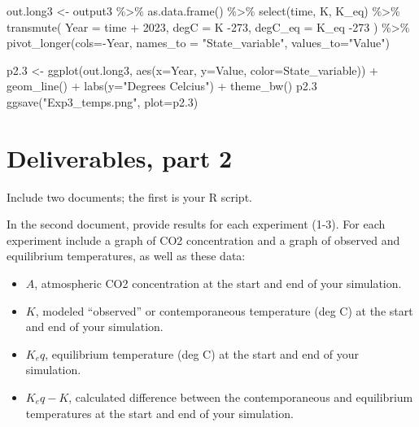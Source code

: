 \documentclass[
  letterpaper,
  DIV=11,
  numbers=noendperiod]{scrreprt}
\newenvironment{Shaded}{\begin{snugshade}}{\end{snugshade}}
\newcommand{\AttributeTok}[1]{\textcolor[rgb]{0.40,0.45,0.13}{#1}}
\newcommand{\DecValTok}[1]{\textcolor[rgb]{0.68,0.00,0.00}{#1}}
\newcommand{\FloatTok}[1]{\textcolor[rgb]{0.68,0.00,0.00}{#1}}
\newcommand{\FunctionTok}[1]{\textcolor[rgb]{0.28,0.35,0.67}{#1}}
\newcommand{\NormalTok}[1]{\textcolor[rgb]{0.00,0.23,0.31}{#1}}
\newcommand{\OtherTok}[1]{\textcolor[rgb]{0.00,0.23,0.31}{#1}}
\newcommand{\SpecialCharTok}[1]{\textcolor[rgb]{0.37,0.37,0.37}{#1}}
\newcommand{\StringTok}[1]{\textcolor[rgb]{0.13,0.47,0.30}{#1}}
\providecommand{\tightlist}{%
  \setlength{\itemsep}{0pt}\setlength{\parskip}{0pt}}
\begin{document}
\begin{Shaded}
\begin{Highlighting}[]
\NormalTok{out.long3 }\OtherTok{\textless{}{-}}\NormalTok{ output3 }\SpecialCharTok{\%\textgreater{}\%} \FunctionTok{as.data.frame}\NormalTok{() }\SpecialCharTok{\%\textgreater{}\%}
  \FunctionTok{select}\NormalTok{(time, K, K\_eq) }\SpecialCharTok{\%\textgreater{}\%}
  \FunctionTok{transmute}\NormalTok{(}
    \AttributeTok{Year =}\NormalTok{ time }\SpecialCharTok{+} \DecValTok{2023}\NormalTok{,}
    \AttributeTok{degC =}\NormalTok{ K }\SpecialCharTok{{-}}\DecValTok{273}\NormalTok{,}
    \AttributeTok{degC\_eq =}\NormalTok{ K\_eq }\SpecialCharTok{{-}}\DecValTok{273}
\NormalTok{  ) }\SpecialCharTok{\%\textgreater{}\%}
  \FunctionTok{pivot\_longer}\NormalTok{(}\AttributeTok{cols=}\SpecialCharTok{{-}}\NormalTok{Year, }\AttributeTok{names\_to =} \StringTok{"State\_variable"}\NormalTok{, }
               \AttributeTok{values\_to=}\StringTok{"Value"}\NormalTok{)}

\NormalTok{p2}\FloatTok{.3} \OtherTok{\textless{}{-}} \FunctionTok{ggplot}\NormalTok{(out.long3, }\FunctionTok{aes}\NormalTok{(}\AttributeTok{x=}\NormalTok{Year, }\AttributeTok{y=}\NormalTok{Value, }\AttributeTok{color=}\NormalTok{State\_variable)) }\SpecialCharTok{+} 
  \FunctionTok{geom\_line}\NormalTok{() }\SpecialCharTok{+} 
  \FunctionTok{labs}\NormalTok{(}\AttributeTok{y=}\StringTok{"Degrees Celcius"}\NormalTok{)  }\SpecialCharTok{+}
  \FunctionTok{theme\_bw}\NormalTok{()}
\NormalTok{p2}\FloatTok{.3}
\FunctionTok{ggsave}\NormalTok{(}\StringTok{"Exp3\_temps.png"}\NormalTok{, }\AttributeTok{plot=}\NormalTok{p2}\FloatTok{.3}\NormalTok{)}
\end{Highlighting}
\end{Shaded}

\section{Deliverables, part 2}\label{sec-deliverables-ei2}

Include two documents; the first is your R script.

In the second document, provide results for each experiment (1-3). For
each experiment include a graph of CO2 concentration and a graph of
observed and equilibrium temperatures, as well as these data:

\begin{itemize}
\tightlist
\item
  \(A\), atmospheric CO2 concentration at the start and end of your
  simulation.
\item
  \(K\), modeled ``observed'' or contemporaneous temperature (deg C) at
  the start and end of your simulation.
\item
  \(K_eq\), equilibrium temperature (deg C) at the start and end of your
  simulation.
\item
  \(K_eq-K\), calculated difference between the contemporaneous and
  equilibrium temperatures at the start and end of your simulation.
\end{itemize}
\end{document}
